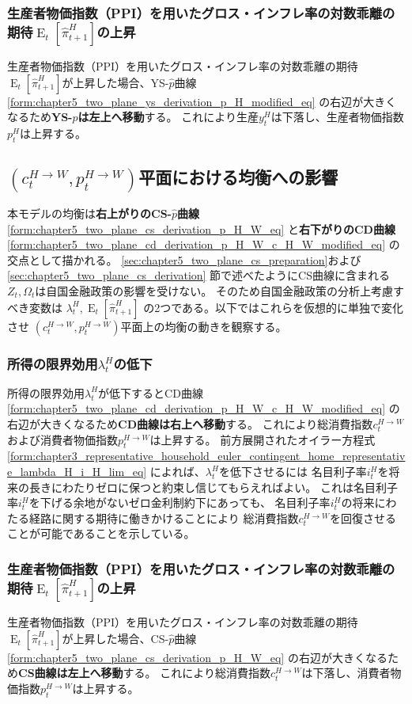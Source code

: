 \subsubsection{生産者物価指数（PPI）を用いたグロス・インフレ率の対数乖離の期待\(\operatorname{E}_t[\hat{\pi}_{t+1}^H]\)の上昇}
\label{sec:chapter5_two_plane_equilibrium_ysyd_E_pi_H_rise}
生産者物価指数（PPI）を用いたグロス・インフレ率の対数乖離の期待
\(\operatorname{E}_t[\hat{\pi}_{t+1}^H]\)が上昇した場合、YS-\(\hat{p}\)曲線
\eqref{form:chapter5_two_plane_ys_derivation_p_H_modified_eq}
の右辺が大きくなるため\textbf{YS-\(\hat{p}\)は左上へ移動}する。
これにより生産\(y_t^H\)は下落し、生産者物価指数\(p_t^H\)は上昇する。

\subsection{\((c_t^{H\to W},p_t^{H\to W})\)平面における均衡への影響}
\label{sec:chapter5_two_plane_equilibrium_cscd}
本モデルの均衡は\textbf{右上がりのCS-\(\hat{p}\)曲線}
\eqref{form:chapter5_two_plane_cs_derivation_p_H_W_eq}
と\textbf{右下がりのCD曲線}
\eqref{form:chapter5_two_plane_cd_derivation_p_H_W_c_H_W_modified_eq}
の交点として描かれる。
\ref{sec:chapter5_two_plane_cs_preparation}および
\ref{sec:chapter5_two_plane_cs_derivation}
節で述べたようにCS曲線に含まれる\(Z_t,\Omega_t\)は自国金融政策の影響を受けない。
そのため自国金融政策の分析上考慮すべき変数は
\(\lambda_t^H,\operatorname{E}_t[\hat{\pi}_{t+1}^H]\)
の2つである。以下ではこれらを仮想的に単独で変化させ
\((c_t^{H\to W},p_t^{H\to W})\)平面上の均衡の動きを観察する。

\subsubsection{所得の限界効用\(\lambda_t^H\)の低下}
\label{sec:chapter5_two_plane_equilibrium_cscd_lambda_H_fall}
所得の限界効用\(\lambda_t^H\)が低下するとCD曲線
\eqref{form:chapter5_two_plane_cd_derivation_p_H_W_c_H_W_modified_eq}
の右辺が大きくなるため\textbf{CD曲線は右上へ移動}する。
これにより総消費指数\(c_t^{H\to W}\)および消費者物価指数\(p_t^{H\to W}\)は上昇する。
前方展開されたオイラー方程式
\eqref{form:chapter3_representative_household_euler_contingent_home_representative_lambda_H_i_H_lim_eq}
によれば、\(\lambda_t^H\)を低下させるには
名目利子率\(i_t^H\)を将来の長きにわたりゼロに保つと約束し信じてもらえればよい。
これは名目利子率\(i_t^H\)を下げる余地がないゼロ金利制約下にあっても、
名目利子率\(i_t^H\)の将来にわたる経路に関する期待に働きかけることにより
総消費指数\(c_t^{H\to W}\)を回復させることが可能であることを示している。

\subsubsection{生産者物価指数（PPI）を用いたグロス・インフレ率の対数乖離の期待\(\operatorname{E}_t[\hat{\pi}_{t+1}^H]\)の上昇}
\label{sec:chapter5_two_plane_equilibrium_cscd_E_pi_H_rise}
生産者物価指数（PPI）を用いたグロス・インフレ率の対数乖離の期待
\(\operatorname{E}_t[\hat{\pi}_{t+1}^H]\)が上昇した場合、CS-\(\hat{p}\)曲線
\eqref{form:chapter5_two_plane_cs_derivation_p_H_W_eq}
の右辺が大きくなるため\textbf{CS曲線は左上へ移動}する。
これにより総消費指数\(c_t^{H\to W}\)は下落し、消費者物価指数\(p_t^{H\to W}\)は上昇する。